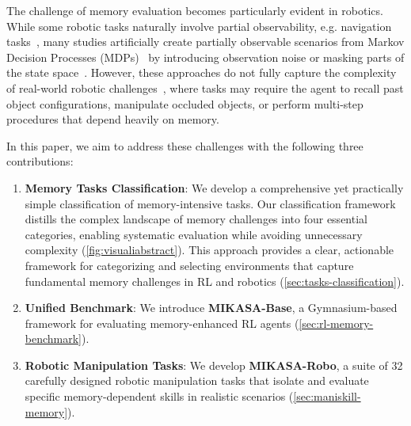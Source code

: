 The challenge of memory evaluation becomes particularly evident in robotics. While some robotic tasks naturally involve partial observability, e.g. navigation tasks~\citep{ai2022deep,habitatchallenge2023}, many studies artificially create partially observable scenarios from Markov Decision Processes (MDPs)~\citep{pomdp_new} by introducing observation noise or masking parts of the state space~\citep{Spaan12pomdp,meng2021memory,kurniawati2022partially,Lauri_2023}. However, these approaches do not fully capture the complexity of real-world robotic challenges~\citep{Lauri_2023}, where tasks may require the agent to recall past object configurations, manipulate occluded objects, or perform multi-step procedures that depend heavily on memory.

In this paper, we aim to address these challenges with the following three contributions:

\begin{enumerate}
    \item \textbf{Memory Tasks Classification}: We develop a comprehensive yet practically simple classification of memory-intensive tasks. Our classification framework distills the complex landscape of memory challenges into four essential categories, enabling systematic evaluation while avoiding unnecessary complexity (\autoref{fig:visualiabstract}). This approach provides a clear, actionable framework for categorizing and selecting environments that capture fundamental memory challenges in RL and robotics (\autoref{sec:tasks-classification}).

    \item \textbf{Unified Benchmark}: We introduce \textbf{MIKASA-Base}, a Gymnasium-based~\citep{towers2024gymnasium} framework for evaluating memory-enhanced RL agents (\autoref{sec:rl-memory-benchmark}).
    
    \item \textbf{Robotic Manipulation Tasks}: We develop \textbf{MIKASA-Robo}, a suite of 32 carefully designed robotic manipulation tasks that isolate and evaluate specific memory-dependent skills in realistic scenarios (\autoref{sec:maniskill-memory}). 
\end{enumerate}

